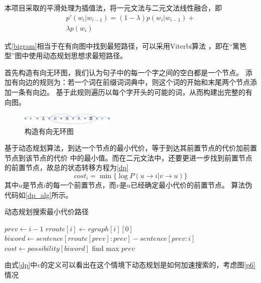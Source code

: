 本项目采取的平滑处理为插值法，将一元文法与二元文法线性融合，即
\begin{equation}
  \begin{split}
    p'\left(w_i|w_{i-1}\right)=
    \left(1-\lambda\right)p\left(w_i|w_{i-1}\right)+\\
    \lambda p\left(w_i\right)
  \end{split}
\end{equation}

式\ref{bigram}相当于在有向图中找到最短路径，可以采用Viterbi算法
\citep{forney1973viterbi}，即在“篱笆型”图中使用动态规划思想求最短路径。

首先构造有向无环图，我们认为句子中的每一个字之间的空白都是一个节点。
添加有向边的规则为：若一个词在前缀词词典中，则这个词的开始和末尾两个节点添加一条有向边。
基于此规则遍历以每个字开头的可能的词，从而构建出完整的有向图。

\begin{figure}[H]
  \centering
  \includegraphics[width=0.4\textwidth]{figures/figure_07.png}
  \caption{构造有向无环图}
\end{figure}

基于动态规划算法，到达一个节点的最小代价，等于到达其前置节点的代价加前置节点到该节点的代价
中的最小值。而在二元文法中，还要更进一步找到前置节点的前置节点，故总的状态转移方程为\ref{dp}
\begin{equation}
  cost_i = \min \{ \log P\left(u \rightarrow i | v \rightarrow u \right) \}
  \label{dp}
\end{equation}
其中$u$是节点$i$的每一个前置节点，而$v$是$u$已经确定最小代价的前置节点。
算法伪代码如\ref{dp_alg}所示。

\begin{algorithm}
  \caption{动态规划搜索最小代价路径}
  \begin{algorithmic}
    \STATE $prev \gets i-1$
    \STATE $rroute[i] \gets rgraph[i][0]$
    \ELSE
    \STATE $biword \gets sentence[rroute[prev]:prev]-sentence[prev:i]$
    \STATE $cost \gets possibility[biword]$
    \ENDFOR
    \STATE find max $prev$
    \ENDIF
    \ENDFOR
  \end{algorithmic}
  \label{dp_alg}
\end{algorithm}

由式\ref{dp}中$v$的定义可以看出在这个情境下动态规划是如何加速搜索的，考虑图\ref{p6}情况

